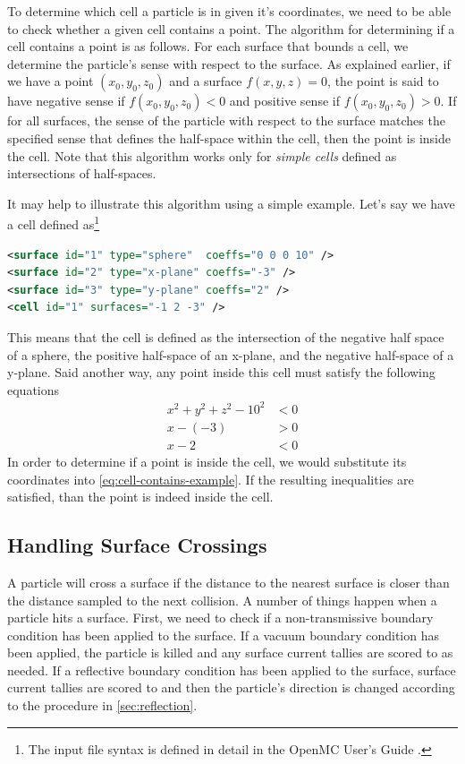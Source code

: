 To determine which cell a particle is in given it's coordinates, we need to be
able to check whether a given cell contains a point. The algorithm for
determining if a cell contains a point is as follows. For each surface that
bounds a cell, we determine the particle's sense with respect to the surface. As
explained earlier, if we have a point $(x_0,y_0,z_0)$ and a surface $f(x,y,z) =
0$, the point is said to have negative sense if $f(x_0,y_0,z_0) < 0$ and
positive sense if $f(x_0,y_0,z_0) > 0$. If for all surfaces, the sense of the
particle with respect to the surface matches the specified sense that defines
the half-space within the cell, then the point is inside the cell. Note that
this algorithm works only for \emph{simple cells} defined as intersections of
half-spaces.

It may help to illustrate this algorithm using a simple example. Let's say we
have a cell defined as\footnote{The input file syntax is defined in detail in
  the OpenMC User's Guide \cite{romano-2012-doc}.}
\begin{lstlisting}[language=xml,frame=none]
<surface id="1" type="sphere"  coeffs="0 0 0 10" />
<surface id="2" type="x-plane" coeffs="-3" />
<surface id="3" type="y-plane" coeffs="2" />
<cell id="1" surfaces="-1 2 -3" />
\end{lstlisting}
This means that the cell is defined as the intersection of the negative half
space of a sphere, the positive half-space of an x-plane, and the negative
half-space of a y-plane. Said another way, any point inside this cell must
satisfy the following equations
\begin{equation}
  \label{eq:cell-contains-example}
  \begin{split}
    x^2 + y^2 + z^2 - 10^2 &< 0 \\
    x - (-3) &> 0 \\
    x - 2 &< 0
  \end{split}
\end{equation}
In order to determine if a point is inside the cell, we would substitute its
coordinates into \eqref{eq:cell-contains-example}. If the resulting inequalities
are satisfied, than the point is indeed inside the cell.

\subsection{Handling Surface Crossings}

A particle will cross a surface if the distance to the nearest surface is closer
than the distance sampled to the next collision. A number of things happen when
a particle hits a surface. First, we need to check if a non-transmissive
boundary condition has been applied to the surface. If a vacuum boundary
condition has been applied, the particle is killed and any surface current
tallies are scored to as needed. If a reflective boundary condition has been
applied to the surface, surface current tallies are scored to and then the
particle's direction is changed according to the procedure in
\autoref{sec:reflection}.

